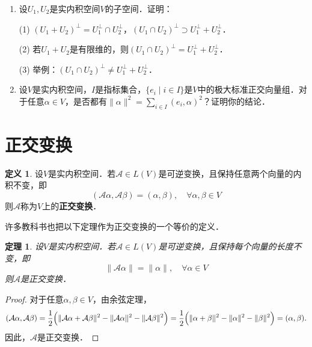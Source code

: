 \documentclass[a4paper,fontset=windows]{ctexbook}
\newtheorem{theorem}{定理}[chapter]
\theoremstyle{definition}
\newtheorem{definition}{定义}[chapter]
\DeclareMathOperator{\Span}{Span}
\begin{document}
\begin{enumerate}
\item 设$U_1,U_2$是实内积空间$V$的子空间．证明：

(1) $(U_1+U_2)^\perp=U_1^\perp\cap U_2^\perp$，$(U_1\cap U_2)^\perp\supset U_1^\perp+U_2^\perp$．

(2) 若$U_1+U_2$是有限维的，则$(U_1\cap U_2)^\perp=U_1^\perp+U_2^\perp$．

(3) 举例：$(U_1\cap U_2)^\perp\ne U_1^\perp+U_2^\perp$．

\item 设$V$是实内积空间，$I$是指标集合，$\{e_i\mid i\in I\}$是$V$中的极大标准正交向量组．对于任意$\alpha\in V$，是否都有$\|\alpha\|^2=\sum\limits_{i\in I}(e_i,\alpha)^2$？证明你的结论．

\end{enumerate}

\clearpage\section{正交变换}

\begin{definition}\label{def10.8}
设$V$是实内积空间．若$\mathcal{A}\in L(V)$是可逆变换，且保持任意两个向量的内积不变，即
$$(\mathcal{A}\alpha,\mathcal{A}\beta)=(\alpha,\beta),\quad\forall\alpha,\beta\in V$$
则$\mathcal{A}$称为$V$上的{\bf 正交变换}．
\end{definition}

许多教科书也把以下定理作为正交变换的一个等价的定义．

\begin{theorem}\label{thm10.9}
设$V$是实内积空间．若$\mathcal{A}\in L(V)$是可逆变换，且保持每个向量的长度不变，即
$$\|\mathcal{A}\alpha\|=\|\alpha\|,\quad\forall\alpha\in V$$
则$\mathcal{A}$是正交变换．
\end{theorem}

\begin{proof}
对于任意$\alpha,\beta\in V$，由余弦定理，
$$(\mathcal{A}\alpha,\mathcal{A}\beta)=\frac{1}{2}\Bigl(\|\mathcal{A}\alpha+\mathcal{A}\beta\|^2-\|\mathcal{A}\alpha\|^2-\|\mathcal{A}\beta\|^2\Bigr)=\frac{1}{2}\Bigl(\|\alpha+\beta\|^2-\|\alpha\|^2-\|\beta\|^2\Bigr)=(\alpha,\beta).$$
因此，$\mathcal{A}$是正交变换．
\end{proof}
\end{document}
